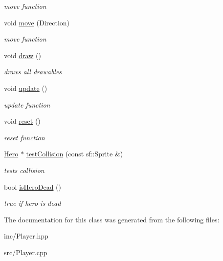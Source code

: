 \begin{DoxyCompactItemize}
\begin{DoxyCompactList}\small\item\em move function \end{DoxyCompactList}\item 
\hypertarget{class_player_a5ac4c25c57cea2f74f9252b765103ac9}{void \hyperlink{class_player_a5ac4c25c57cea2f74f9252b765103ac9}{move} (Direction)}\label{class_player_a5ac4c25c57cea2f74f9252b765103ac9}

\begin{DoxyCompactList}\small\item\em move function \end{DoxyCompactList}\item 
\hypertarget{class_player_ac18c9d30d2997765321c62030a4b20b7}{void \hyperlink{class_player_ac18c9d30d2997765321c62030a4b20b7}{draw} ()}\label{class_player_ac18c9d30d2997765321c62030a4b20b7}

\begin{DoxyCompactList}\small\item\em draws all drawables \end{DoxyCompactList}\item 
\hypertarget{class_player_a82c3476f3e65a4e2ac6bcd040771bdd4}{void \hyperlink{class_player_a82c3476f3e65a4e2ac6bcd040771bdd4}{update} ()}\label{class_player_a82c3476f3e65a4e2ac6bcd040771bdd4}

\begin{DoxyCompactList}\small\item\em update function \end{DoxyCompactList}\item 
\hypertarget{class_player_a1af5d39f7bac2aeaa1e30c7dda2332fa}{void \hyperlink{class_player_a1af5d39f7bac2aeaa1e30c7dda2332fa}{reset} ()}\label{class_player_a1af5d39f7bac2aeaa1e30c7dda2332fa}

\begin{DoxyCompactList}\small\item\em reset function \end{DoxyCompactList}\item 
\hypertarget{class_player_aee54537574cb8e29cd6b2d34382cf3d3}{\hyperlink{class_hero}{Hero} $\ast$ \hyperlink{class_player_aee54537574cb8e29cd6b2d34382cf3d3}{test\+Collision} (const sf\+::\+Sprite \&)}\label{class_player_aee54537574cb8e29cd6b2d34382cf3d3}

\begin{DoxyCompactList}\small\item\em tests collision \end{DoxyCompactList}\item 
\hypertarget{class_player_ad890ba1e27ad3e06d36dc018e9e28454}{bool \hyperlink{class_player_ad890ba1e27ad3e06d36dc018e9e28454}{is\+Hero\+Dead} ()}\label{class_player_ad890ba1e27ad3e06d36dc018e9e28454}

\begin{DoxyCompactList}\small\item\em true if hero is dead \end{DoxyCompactList}\end{DoxyCompactItemize}


The documentation for this class was generated from the following files\+:\begin{DoxyCompactItemize}
\item 
inc/Player.\+hpp\item 
src/Player.\+cpp\end{DoxyCompactItemize}
